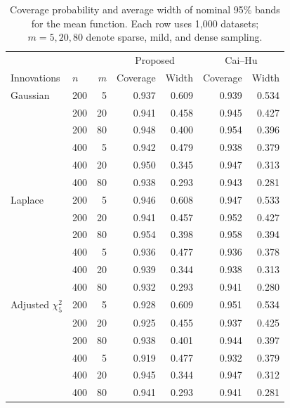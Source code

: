 \begin{table}[!tbp]
\centering
\caption{Coverage probability and average width of nominal 95\% bands for the mean function. Each row uses 1,000 datasets; $m=5,20,80$ denote sparse, mild, and dense sampling.}
\label{tab:mean-new}
\renewcommand{\baselinestretch}{1.2}\small
\begin{tabular}{llrrrrr}
\toprule
& & & \multicolumn{2}{c}{Proposed} & \multicolumn{2}{c}{Cai--Hu}\\
Innovations & $n$ & $m$ & Coverage & Width & Coverage & Width\\
\midrule
Gaussian & 200 & 5 & 0.937 & 0.609 & 0.939 & 0.534\\
 & 200 & 20 & 0.941 & 0.458 & 0.945 & 0.427\\
 & 200 & 80 & 0.948 & 0.400 & 0.954 & 0.396\\
 & 400 & 5 & 0.942 & 0.479 & 0.938 & 0.379\\
 & 400 & 20 & 0.950 & 0.345 & 0.947 & 0.313\\
 & 400 & 80 & 0.938 & 0.293 & 0.943 & 0.281\\
\midrule
Laplace & 200 & 5 & 0.946 & 0.608 & 0.947 & 0.533\\
 & 200 & 20 & 0.941 & 0.457 & 0.952 & 0.427\\
 & 200 & 80 & 0.954 & 0.398 & 0.958 & 0.394\\
 & 400 & 5 & 0.936 & 0.477 & 0.936 & 0.378\\
 & 400 & 20 & 0.939 & 0.344 & 0.938 & 0.313\\
 & 400 & 80 & 0.932 & 0.293 & 0.941 & 0.280\\
\midrule
Adjusted $\chi^2_5$ & 200 & 5 & 0.928 & 0.609 & 0.951 & 0.534\\
 & 200 & 20 & 0.925 & 0.455 & 0.937 & 0.425\\
 & 200 & 80 & 0.938 & 0.401 & 0.944 & 0.397\\
 & 400 & 5 & 0.919 & 0.477 & 0.932 & 0.379\\
 & 400 & 20 & 0.945 & 0.344 & 0.947 & 0.312\\
 & 400 & 80 & 0.941 & 0.293 & 0.941 & 0.281\\
\bottomrule
\end{tabular}
\end{table}
